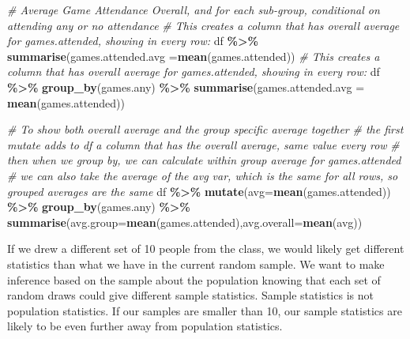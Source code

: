 \documentclass[
]{book}
\newenvironment{Shaded}{\begin{snugshade}}{\end{snugshade}}
\newcommand{\CommentTok}[1]{\textcolor[rgb]{0.56,0.35,0.01}{\textit{#1}}}
\newcommand{\DataTypeTok}[1]{\textcolor[rgb]{0.13,0.29,0.53}{#1}}
\newcommand{\KeywordTok}[1]{\textcolor[rgb]{0.13,0.29,0.53}{\textbf{#1}}}
\newcommand{\NormalTok}[1]{#1}
\newcommand{\OperatorTok}[1]{\textcolor[rgb]{0.81,0.36,0.00}{\textbf{#1}}}
\newcommand{\StringTok}[1]{\textcolor[rgb]{0.31,0.60,0.02}{#1}}
\begin{document}
\begin{Shaded}
\begin{Highlighting}[]
\CommentTok{\# Average Game Attendance Overall, and for each sub{-}group, conditional on attending any or no attendance}
\CommentTok{\# This creates a column that has overall average for games.attended, showing in every row:}
\NormalTok{df }\OperatorTok{\%\textgreater{}\%}\StringTok{ }\KeywordTok{summarise}\NormalTok{(}\DataTypeTok{games.attended.avg =}\KeywordTok{mean}\NormalTok{(games.attended))}
\CommentTok{\# This creates a column that has overall average for games.attended, showing in every row:}
\NormalTok{df }\OperatorTok{\%\textgreater{}\%}\StringTok{ }\KeywordTok{group\_by}\NormalTok{(games.any) }\OperatorTok{\%\textgreater{}\%}\StringTok{ }\KeywordTok{summarise}\NormalTok{(}\DataTypeTok{games.attended.avg =} \KeywordTok{mean}\NormalTok{(games.attended))}
\end{Highlighting}
\end{Shaded}

\begin{Shaded}
\begin{Highlighting}[]
\CommentTok{\# To show both overall average and the group specific average together}
\CommentTok{\#   the first mutate adds to df a column that has the overall average, same value every row}
\CommentTok{\#   then when we group by, we can calculate within group average for games.attended}
\CommentTok{\#   we can also take the average of the avg var, which is the same for all rows, so grouped averages are the same}
\NormalTok{df }\OperatorTok{\%\textgreater{}\%}
\StringTok{   }\KeywordTok{mutate}\NormalTok{(}\DataTypeTok{avg=}\KeywordTok{mean}\NormalTok{(games.attended)) }\OperatorTok{\%\textgreater{}\%}
\StringTok{   }\KeywordTok{group\_by}\NormalTok{(games.any) }\OperatorTok{\%\textgreater{}\%}
\StringTok{   }\KeywordTok{summarise}\NormalTok{(}\DataTypeTok{avg.group=}\KeywordTok{mean}\NormalTok{(games.attended),}\DataTypeTok{avg.overall=}\KeywordTok{mean}\NormalTok{(avg))}
\end{Highlighting}
\end{Shaded}

If we drew a different set of 10 people from the class, we would likely get different statistics than what we have in the current random sample. We want to make inference based on the sample about the population knowing that each set of random draws could give different sample statistics. Sample statistics is not population statistics. If our samples are smaller than 10, our sample statistics are likely to be even further away from population statistics.
\end{document}

